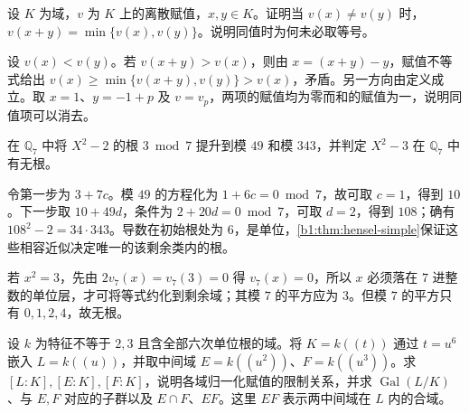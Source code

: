 \BookExercises

\begin{exercise}\label{b1:ex:D-valuation-cancellation}
	设 \(K\) 为域，\(v\) 为 \(K\) 上的离散赋值，\(x,y\in K\)。证明当 \(v(x)\neq v(y)\) 时，\(v(x+y)=\min\{v(x),v(y)\}\)。说明同值时为何未必取等号。
\end{exercise}

\begin{solution}
	设 \(v(x)<v(y)\)。若 \(v(x+y)>v(x)\)，则由 \(x=(x+y)-y\)，赋值不等式给出 \(v(x)\geq\min\{v(x+y),v(y)\}>v(x)\)，矛盾。另一方向由定义成立。取 \(x=1\)、\(y=-1+p\) 及 \(v=v_p\)，两项的赋值均为零而和的赋值为一，说明同值项可以消去。
\end{solution}

\begin{exercise}\label{b1:ex:D-hensel-seven}
	在 \(\mathbb Q_7\) 中将 \(X^2-2\) 的根 \(3\bmod7\) 提升到模 \(49\) 和模 \(343\)，并判定 \(X^2-3\) 在 \(\mathbb Q_7\) 中有无根。
\end{exercise}

\begin{solution}
	令第一步为 \(3+7c\)。模 \(49\) 的方程化为 \(1+6c=0\bmod7\)，故可取 \(c=1\)，得到 \(10\)。下一步取 \(10+49d\)，条件为 \(2+20d=0\bmod7\)，可取 \(d=2\)，得到 \(108\)；确有 \(108^2-2=34\cdot343\)。导数在初始根处为 \(6\)，是单位，\cref{b1:thm:hensel-simple}保证这些相容近似决定唯一的该剩余类内的根。

	若 \(x^2=3\)，先由 \(2v_7(x)=v_7(3)=0\) 得 \(v_7(x)=0\)，所以 \(x\) 必须落在 \(7\) 进整数的单位层，才可将等式约化到剩余域；其模 \(7\) 的平方应为 \(3\)。但模 \(7\) 的平方只有 \(0,1,2,4\)，故无根。
\end{solution}

\begin{exercise}\label{b1:ex:D-laurent-extension}
	设 \(k\) 为特征不等于 \(2,3\) 且含全部六次单位根的域。将 \(K=k(\!(t)\!)\) 通过 \(t=u^6\) 嵌入 \(L=k(\!(u)\!)\)，并取中间域 \(E=k(\!(u^2)\!)\)、\(F=k(\!(u^3)\!)\)。求 \([L:K],[E:K],[F:K]\)，说明各域归一化赋值的限制关系，并求 \(\operatorname{Gal}(L/K)\)、与 \(E,F\) 对应的子群以及 \(E\cap F\)、\(EF\)。这里 \(EF\) 表示两中间域在 \(L\) 内的合域。
\end{exercise}

